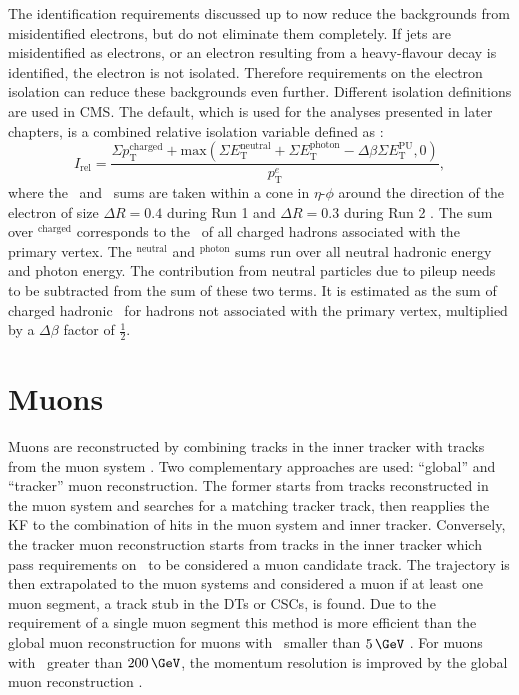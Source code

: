 The identification requirements discussed up to now reduce the backgrounds 
from misidentified electrons, but do not eliminate them completely. If jets are
misidentified as electrons, or an electron resulting from a heavy-flavour 
decay is identified, the electron is not isolated. Therefore requirements
on the electron isolation can reduce these backgrounds even further.
Different isolation definitions are used in \ac{CMS}. The default, which is
used for the analyses presented in later chapters, is a combined relative isolation variable
defined as \cite{SMHtautauCMS}:
\begin{equation}\label{eqn:electron_reliso}
I_{\text{rel}} = \frac{\Sigma p_{\text{T}}^{\text{charged}} + \mathrm{max}(\Sigma E_{\text{T}}^{\text{neutral}} + \Sigma E_{\text{T}}^{\text{photon}} - \Delta\beta \Sigma E_{\text{T}}^{\text{PU}},0)}{p_{\text{T}}^{e}},
\end{equation}
where the \pT~and \ET~sums are taken within a cone in $\eta$-$\phi$ around the direction
of the electron of size $\Delta R = 0.4$ during Run 1 and $\Delta R = 0.3$ during Run 2 \cite{CMS-PAS-HIG-16-037}.
The sum over \pT$^{\text{charged}}$ corresponds to the \pT~of all charged %
hadrons associated with the primary vertex. %
The \ET$^{\text{neutral}}$ and \ET$^{\text{photon}}$ sums
run over all neutral hadronic energy and photon energy. %
The contribution from neutral particles due to pileup needs to be subtracted from
the sum of these two terms. It is estimated as the sum of charged hadronic \pT~for hadrons not associated
with the primary vertex, multiplied by a $\Delta \beta$ factor of $\frac{1}{2}$.

\section{Muons}
\label{sec:objects_muo}
Muons are reconstructed by combining tracks in the inner tracker with tracks
from the muon system \cite{cms-muon-reco}. Two complementary approaches are used:
``global'' and ``tracker'' muon reconstruction. The former starts from 
tracks reconstructed in the muon system and searches for a matching
tracker track, then reapplies the \ac{KF} to the combination
of hits in the muon system and inner tracker. Conversely, the tracker muon reconstruction starts from
tracks in the inner tracker which pass requirements on \pT~to be considered
a muon candidate track. The trajectory is then extrapolated to the muon systems and
considered a muon if at least one muon segment, a track stub in the \ac{DTs} or \ac{CSCs}, is found.
Due to the requirement of a single muon segment this method is more efficient than the global muon
reconstruction for muons with \pT~smaller than $5\,\GeV$ \cite{cms-muon-reco}.
For muons with \pT~greater than $200\,\GeV$, the momentum resolution is improved
by the global muon reconstruction \cite{cms-muon-cosmics-perf}.


